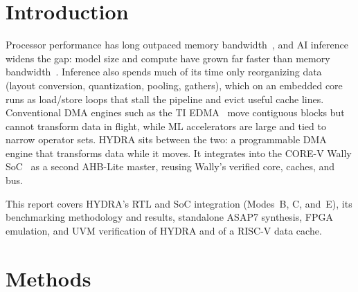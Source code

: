 \documentclass[conference]{IEEEtran}
\begin{document}
\section{Introduction}
    Processor performance has long outpaced memory
    bandwidth~\cite{wulf1995}, and AI inference widens the gap: model size
    and compute have grown far faster than memory
    bandwidth~\cite{gholami2024}. Inference also spends much of its time
    only reorganizing data (layout conversion, quantization, pooling,
    gathers), which on an embedded core runs as load/store loops that
    stall the pipeline and evict useful cache lines. Conventional DMA
    engines such as the TI EDMA~\cite{ti_edma} move contiguous blocks but
    cannot transform data in flight, while ML accelerators are large and
    tied to narrow operator sets. HYDRA sits between the two: a
    programmable DMA engine that transforms data while it moves. It
    integrates into the CORE-V Wally SoC~\cite{harris2025wally} as a second
    AHB-Lite master, reusing Wally's verified core, caches, and bus.
 
    This report covers HYDRA's RTL and SoC integration (Modes~B, C,
    and~E), its benchmarking methodology and results, standalone ASAP7
    synthesis, FPGA emulation, and UVM verification of HYDRA and of a
    RISC-V data cache.
\section{Methods}
\end{document}
